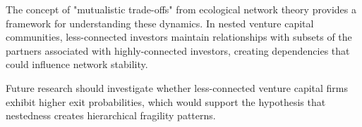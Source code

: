 The concept of "mutualistic trade-offs" from ecological network theory provides a framework for understanding these dynamics. In nested venture capital communities, less-connected investors maintain relationships with subsets of the partners associated with highly-connected investors, creating dependencies that could influence network stability. 

Future research should investigate whether less-connected venture capital firms exhibit higher exit probabilities, which would support the hypothesis that nestedness creates hierarchical fragility patterns.
